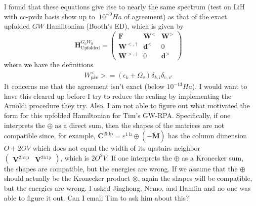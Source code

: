 \begin{tcolorbox}[colback=red!10!white, colframe=red!50!black, title=It is unclear where these equations come from]
I found that these equations give rise to nearly the same spectrum (test on LiH with cc-pvdz basis show up to $~10^{-9} Ha$ of agreement) as that of the exact upfolded $GW$ Hamiltonian (Booth's ED), which is given by
\begin{equation}
    \bm{H}_{\text{Upfolded}}^{G_0W_0} = \begin{pmatrix} \bm{F} & \bm{W}^< & \bm{W}^> \\ \bm{W}^{<,\dagger} & \bm{d}^< & 0 \\ \bm{W}^{>, \dagger} & 0 & \bm{d}^> \end{pmatrix}
\label{eq:booth_hamiltonian}
\end{equation}
where we have the definitions
\begin{align}
    W_{pkv}^< > = \left(\epsilon_k + \Omega_v\right) \delta_{k,l} \delta_{v,v'}
\label{eq:booth_definitions}
\end{align}
It concerns me that the agreement isn't exact (below $10^{-13} Ha$). I would want to have this cleared up before I try to reduce the scaling by implementing the Arnoldi procedure they try. Also, I am not able to figure out what motivated the form for this upfolded Hamiltonian for Tim's GW-RPA. Specifically, if one interprets the $\oplus$ as a direct sum, then the shapes of the matrices are not compatible since, for example, $\mathbf{C}^{2 \mathrm{hlp}}=\varepsilon^{1 \mathrm{~h}} \oplus(-\tilde{\mathbf{M}})$ has the column dimension $O+2OV$ which does not equal the width of its upstairs neighbor $\begin{pmatrix}
    \bm{V}^{2\mathrm{h1p}} & \bm{V}^{2\mathrm{h1p}}
\end{pmatrix}$, which is $2O^2V$. If one interprets the $\oplus$ as a Kronecker sum, the shapes are compatible, but the energies are wrong. If we assume that the $\oplus$ should actually be the Kronecker product $\otimes$, again the shapes will be compatible, but the energies are wrong. I asked Jinghong, Nemo, and Hamlin and no one was able to figure it out. Can I email Tim to ask him about this?
\end{tcolorbox}

